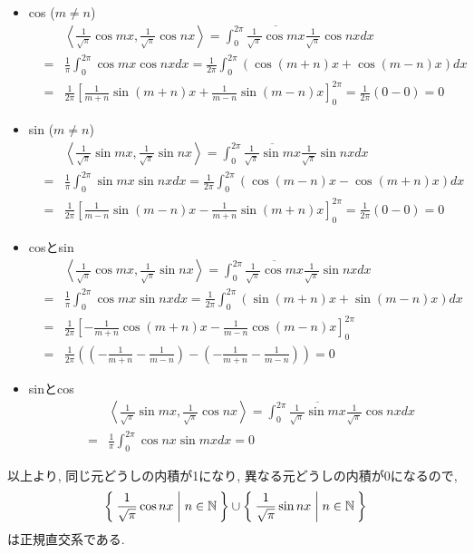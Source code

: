\documentclass[a4paper,11pt]{jsarticle}
\begin{document}
\begin{itemize}
  \item cos ($m \neq n$)
    \begin{eqnarray*}
      && \left<\frac{1}{\sqrt{\pi}}\cos{mx}, \frac{1}{\sqrt{\pi}}\cos{nx}\right>
      = \int_{0}^{2\pi}{\overline{\frac{1}{\sqrt{\pi}}\cos{mx}}\frac{1}{\sqrt{\pi}}\cos{nx}}dx \\
      &=& \frac{1}{\pi}\int_{0}^{2\pi}{\cos{mx}\cos{nx}}dx
      = \frac{1}{2\pi}\int_{0}^{2\pi}{\left(\cos{(m + n)x} + \cos{(m - n)x}\right)}dx \\
      &=& \frac{1}{2\pi}\left[\frac{1}{m + n}\sin{(m + n)x} + \frac{1}{m - n}\sin{(m - n)x}\right]_{0}^{2\pi}
      = \frac{1}{2\pi}\left(0 - 0\right) = 0
    \end{eqnarray*}
  \item sin ($m \neq n$)
    \begin{eqnarray*}
      && \left<\frac{1}{\sqrt{\pi}}\sin{mx}, \frac{1}{\sqrt{\pi}}\sin{nx}\right>
      = \int_{0}^{2\pi}{\overline{\frac{1}{\sqrt{\pi}}\sin{mx}}\frac{1}{\sqrt{\pi}}\sin{nx}}dx \\
      &=& \frac{1}{\pi}\int_{0}^{2\pi}{\sin{mx}\sin{nx}}dx
      = \frac{1}{2\pi}\int_{0}^{2\pi}{\left(\cos{(m - n)x} - \cos{(m + n)x}\right)}dx \\
      &=& \frac{1}{2\pi}\left[\frac{1}{m - n}\sin{(m - n)x} - \frac{1}{m + n}\sin{(m + n)x}\right]_{0}^{2\pi}
      = \frac{1}{2\pi}\left(0 - 0\right) = 0
    \end{eqnarray*}
  \item cosとsin
    \begin{eqnarray*}
      && \left<\frac{1}{\sqrt{\pi}}\cos{mx}, \frac{1}{\sqrt{\pi}}\sin{nx}\right>
      = \int_{0}^{2\pi}{\overline{\frac{1}{\sqrt{\pi}}\cos{mx}}\frac{1}{\sqrt{\pi}}\sin{nx}}dx \\
      &=& \frac{1}{\pi}\int_{0}^{2\pi}{\cos{mx}\sin{nx}}dx
      = \frac{1}{2\pi}\int_{0}^{2\pi}{\left(\sin{(m + n)x} + \sin{(m - n)x}\right)}dx \\
      &=& \frac{1}{2\pi}\left[-\frac{1}{m + n}\cos{(m + n)x} - \frac{1}{m - n}\cos{(m - n)x}\right]_{0}^{2\pi} \\
      &=& \frac{1}{2\pi}\left(\left(-\frac{1}{m + n} -\frac{1}{m - n}\right)-\left(-\frac{1}{m + n} -\frac{1}{m - n}\right)\right) = 0
    \end{eqnarray*}
  \item sinとcos
    \begin{eqnarray*}
      && \left<\frac{1}{\sqrt{\pi}}\sin{mx}, \frac{1}{\sqrt{\pi}}\cos{nx}\right>
      = \int_{0}^{2\pi}{\overline{\frac{1}{\sqrt{\pi}}\sin{mx}}\frac{1}{\sqrt{\pi}}\cos{nx}}dx \\
      &=& \frac{1}{\pi}\int_{0}^{2\pi}{\cos{nx}\sin{mx}}dx
      = 0
    \end{eqnarray*}
\end{itemize}
以上より, 同じ元どうしの内積が1になり, 
異なる元どうしの内積が0になるので, 
\[
  \Set{\frac{1}{\sqrt{\pi}}\cos{nx} | n \in \mathbb{N}}
  \cup \Set{\frac{1}{\sqrt{\pi}}\sin{nx} | n \in \mathbb{N}}
\]
は正規直交系である.
\end{document}
